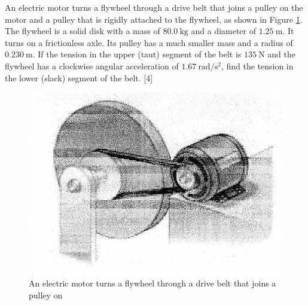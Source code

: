 \begin{problem}
    An electric motor turns a flywheel through a drive belt that joins a pulley on the motor and a pulley that is rigidly attached to the flywheel, as shown in Figure \ref{2010q7}. The flywheel is a solid disk with a mass of $\qty{80.0}{\kg}$ and a diameter of $\qty{1.25}{\m}$. It turns on a frictionless axle. Its pulley has a much smaller mass and a radius of $\qty{0.230}{\m}$. If the tension in the upper (taut) segment of the belt is $\qty{135}{\N}$ and the flywheel has a clockwise angular acceleration of $\qty{1.67}{\radian\per\s\squared}$, find the tension in the lower (slack) segment of the belt. \hfill{[4]}
    \begin{figure}[h]
	    \centering
	    \includegraphics[width=0.5\linewidth]{spho_book_TYS_images/2010q7.png}
	    \caption{An electric motor turns a flywheel through a drive belt that joins a pulley on}\label{2010q7}
    \end{figure}
\end{problem}

